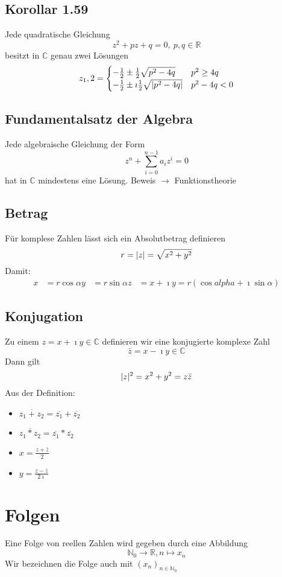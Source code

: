 \documentclass[a4paper]{scrartcl}
\DeclarePairedDelimiter\abs{\lvert}{\rvert}%
\newcommand{\I}{\ensuremath{\imath}}%
\begin{document}
\subsection{Korollar 1.59}
\label{sec-3-5}
Jede quadratische Gleichung
\[z^2+p z + q = 0,~p,q\in\mathbb{R}\]
besitzt in $\mathbb{C}$ genau zwei Lösungen
\[z_1,2 = \begin{cases} -\frac{1}{2}\pm \frac{1}{2}\sqrt{p^2 - 4q} & p^2 \geq 4q \\ -\frac{1}{2}\pm \I\frac{1}{2}\sqrt{\abs{p^2 - 4q}} & p^2 - 4q < 0 \end{cases} \]
\subsection{Fundamentalsatz der Algebra}
\label{sec-3-6}
Jede algebraische Gleichung der Form \[z^n + \sum_{i = 0}^{n - 1} a_i z^i = 0\]
hat in $\mathbb{C}$ mindestens eine Lösung. Beweis $\rightarrow$ Funktionstheorie
\subsection{Betrag}
\label{sec-3-7}
Für komplese Zahlen lässt sich ein Absolutbetrag definieren
\[r = \abs{z} = \sqrt{x^2 + y^2}\]
Damit:
\begin{align}
x &= r\cos{\alpha}
y &= r\sin{\alpha}
z &= x + \I y = r(\cos{alpha} + \I\sin{\alpha})
\end{align}
\subsection{Konjugation}
\label{sec-3-8}
Zu einem $z = x + \I y\in\mathbb{C}$ definieren wir eine konjugierte komplexe Zahl \[\bar z = x - \I y \in\mathbb{C}\]
Dann gilt \[\abs{z}^2 = x^2 + y^2 = z\bar z\]
Aus der Definition:
\begin{itemize}
\item $\overline{z_1 + z_2} = \overline{z_1} + \overline{z_2}$
\item $\overline{z_1 * z_2} = \overline{z_1} * \overline{z_2}$
\item $x = \frac{z + \bar z}{2}$
\item $y = \frac{z - \bar z}{2\I}$
\end{itemize}
\section{Folgen}
\label{sec-4}
Eine Folge von reellen Zahlen wird gegeben durch eine Abbildung \[\mathbb{N}_0 \to \mathbb{R},n\mapsto x_n\]
Wir bezeichnen die Folge auch mit $(x_n)_{n\in\mathbb{N}_0}$
\end{document}
